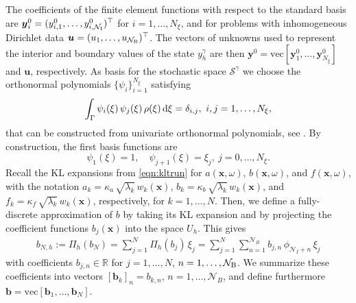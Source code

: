 \documentclass[a4paper,10pt]{article}
\newcommand{\R}{{\mathbb{R}}}
\newcommand{\N}{{\mathcal{N}}}
\renewcommand{\d}{\textup{d}}
\numberwithin{theorem}{section}
\begin{document}
The coefficients of the finite element functions with respect to the standard basis are $\boldsymbol{y}_i^{0} = (y^{0}_{i,1},\ldots,y^{0}_{i,\N_{\textup{I}}})^\top$ for $i=1,\ldots,N_{\xi}$, and for problems with inhomogeneous Dirichlet data $\boldsymbol{u} = (u_1,\ldots,u_{\N_\textup{B}})^\top$. The vectors of unknowns used to represent the interior and boundary values of the state $y_h^\gamma$ are then $\boldsymbol y^0 = \text{vec}[\boldsymbol{y}_1^{0},\ldots,\boldsymbol{y}^0_{N_{\xi}}]$ and  $\boldsymbol{u}$, respectively.
As basis for the stochastic space $\mathcal S^\gamma$ we choose the orthonormal polynomials $\{\psi_i\}_{i=1}^{N_\xi}$ satisfying 
\begin{equation*}
  \int_\Gamma \psi_i(\xi)\,\psi_j(\xi)\,\rho(\xi)\,\d\xi=\delta_{i,j},\ i,j=1,\ldots,N_{\xi},
\end{equation*}
that can be constructed from univariate orthonormal polynomials, see \cite{OGErnst_EUllmann_2010}. By construction, the first basis functions are
\begin{equation*}
	\psi_1(\xi) = 1,\quad \psi_{j+1}(\xi) = \xi_j,\ j=0,\ldots,N_{\xi}.
\end{equation*}
Recall the KL expansions from \eqref{eqn:kltrun} for $a(\boldsymbol{x},\omega)$, $b(\boldsymbol{x},\omega)$, and $f(\boldsymbol{x},\omega)$, with the notation $a_k = \kappa_a \, \sqrt{\lambda_k}\,w_k(\boldsymbol{x})$, $b_k = \kappa_b \, \sqrt{\lambda_k}\,w_k(\boldsymbol{x})$, and $f_k = \kappa_f \, \sqrt{\lambda_k}\,w_k(\boldsymbol{x})$, respectively, for $k=1, \dots, N$. Then, we define a fully-discrete approximation of $b$ by taking its KL expansion and by projecting the coefficient functions $b_j(\boldsymbol x)$ into  the space $U_h$. This gives
\begin{align*}
	b_{N,h} := \Pi_h (b_N) = \sum_{j=1}^N \Pi_h(b_{j})\,\xi_j 
	 = \sum_{j=1}^N \sum_{n=1}^{\mathcal N_B} b_{j,n}\,\phi_{\mathcal N_I+n}\,\xi_j 
\end{align*}
with coefficients $b_{j,n}\in\R$ for $j=1,\ldots,N$, $n=1,\ldots,\N_{\textup{B}}$.
We summarize these coefficients into vectors $[\boldsymbol b_k]_n = b_{k,n}$, $n=1,\ldots,\N_B$, and define furthermore $\boldsymbol b = \text{vec}[\boldsymbol b_1,\ldots, \boldsymbol b_N]$.
\end{document}
